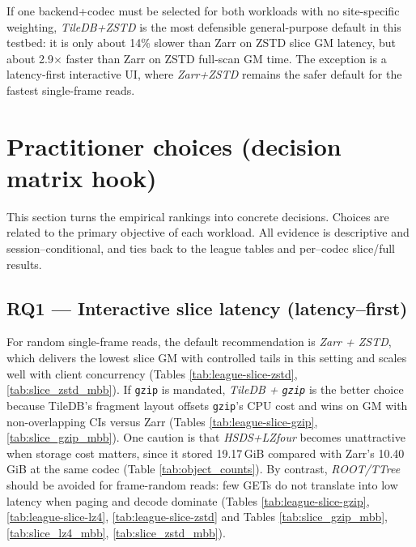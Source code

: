 \documentclass[nomenclature, english, bibtex]{kththesis}
\numberwithin{listing}{chapter}
\begin{document}
If one backend+codec must be selected for both workloads with no site-specific weighting, \emph{TileDB+\gls{ZSTD}} is the most defensible general-purpose default in this testbed: it is only about 14\% slower than Zarr on \gls{ZSTD} slice \gls{GM} latency, but about 2.9\(\times\) faster than Zarr on \gls{ZSTD} full-scan \gls{GM} time. The exception is a latency-first interactive UI, where \emph{Zarr+\gls{ZSTD}} remains the safer default for the fastest single-frame reads.

\section{Practitioner choices (decision matrix hook)}
This section turns the empirical rankings into concrete decisions. Choices are related to the primary objective of each workload. All evidence is descriptive and session–conditional, and ties back to the league tables and per–codec slice/full results.

\subsection{RQ1 — Interactive slice latency (latency–first)}
For random single-frame reads, the default recommendation is \emph{Zarr + \gls{ZSTD}}, which delivers the lowest slice \gls{GM} with controlled tails in this setting and scales well with client concurrency (Tables \ref{tab:league-slice-zstd}, \ref{tab:slice_zstd_mbb}). If \texttt{gzip} is mandated, \emph{TileDB + \texttt{gzip}} is the better choice because TileDB’s fragment layout offsets \texttt{gzip}’s \gls{CPU} cost and wins on \gls{GM} with non-overlapping \glspl{CI} versus Zarr (Tables \ref{tab:league-slice-gzip}, \ref{tab:slice_gzip_mbb}). One caution is that \emph{\gls{HSDS}+\gls{LZfour}} becomes unattractive when storage cost matters, since it stored 19.17\,GiB compared with Zarr’s 10.40\,GiB at the same codec (Table \ref{tab:object_counts}). By contrast, \emph{\gls{ROOT}/\gls{TTree}} should be avoided for frame-random reads: few GETs do not translate into low latency when paging and decode dominate (Tables \ref{tab:league-slice-gzip}, \ref{tab:league-slice-lz4}, \ref{tab:league-slice-zstd} and Tables \ref{tab:slice_gzip_mbb}, \ref{tab:slice_lz4_mbb}, \ref{tab:slice_zstd_mbb}).
\end{document}
